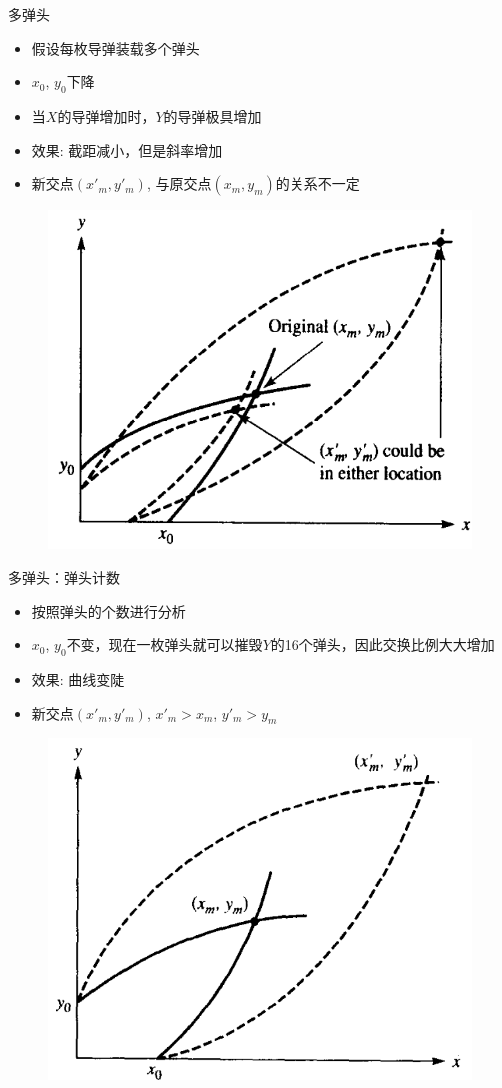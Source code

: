 \documentclass[UTF8]{ctexbeamer}
\begin{document}
\begin{frame}{多弹头}
  \begin{itemize}
  \item 假设每枚导弹装载多个弹头
  \item $x_0$, $y_0$下降
  \item 当$X$的导弹增加时，$Y$的导弹极具增加
  \item 效果: 截距减小，但是斜率增加
  \item 新交点$(x'_m, y'_m)$, 与原交点$(x_m, y_m)$的关系不一定
  \end{itemize}

  \begin{figure}
    \centering
    \includegraphics[width=.45\textwidth]{mw.png}
  \end{figure}
  
\end{frame}

\begin{frame}{多弹头：弹头计数}
  \begin{itemize}
  \item 按照弹头的个数进行分析
  \item $x_0$, $y_0$不变，现在一枚弹头就可以摧毁$Y$的16个弹头，因此交换比例大大增加
  \item 效果: 曲线变陡
  \item 新交点$(x'_m, y'_m)$, $x'_m > x_m$, $y'_m > y_m$
  \end{itemize}

  \begin{figure}
    \centering
    \includegraphics[width=.45\textwidth]{wc.png}
  \end{figure}
  
\end{frame}
\end{document}

